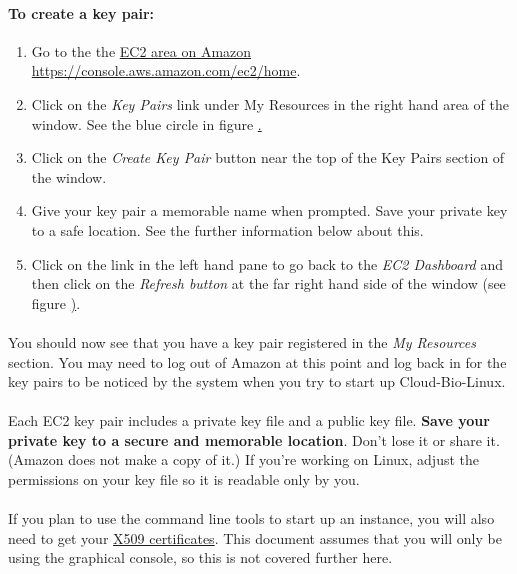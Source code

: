 \paragraph{To create a key pair:}
\begin{enumerate}
\item Go to the the \href{https://console.aws.amazon.com/ec2/home}{EC2 area on Amazon https://console.aws.amazon.com/ec2/home}.
\item Click on the \emph{Key Pairs} link under My Resources in the right hand area of the window. See the blue circle in figure \href{fig:ec2homepage}.
\item Click on the \emph{Create Key Pair} button near the top of the Key Pairs section of the window.
\item Give your key pair a memorable name when prompted. Save your private key to a safe location. See the further information below about this. 
\item Click on the link in the left hand pane to go back to the \emph{EC2 Dashboard} and then click on the \emph{Refresh button} at the far right hand side of the window (see figure \href{fig:ec2homepage}). 
\end{enumerate}

\paragraph{}You should now see that you have a key pair registered in the \emph{My Resources} section. 
You may need to log out of Amazon at this point and log back in for the key pairs to be noticed by the system when you try to start up Cloud-Bio-Linux. 


\paragraph{}Each EC2 key pair includes a private key file and a public key file. \textbf{Save your private key to a secure and memorable location}. Don't lose it or share it. (Amazon does not make a copy of it.) If you're working on Linux, adjust the permissions on your key file so it is readable only by you. 

\paragraph{}If you plan to use the command line tools to start up an instance, you will also need to get your \href{http://docs.amazonwebservices.com/AWSSecurityCredentials/1.0/AboutAWSCredentials.html#X509Credentials}{X509 certificates}. This document assumes that you will only be using the graphical console, so this is not covered further here. 

